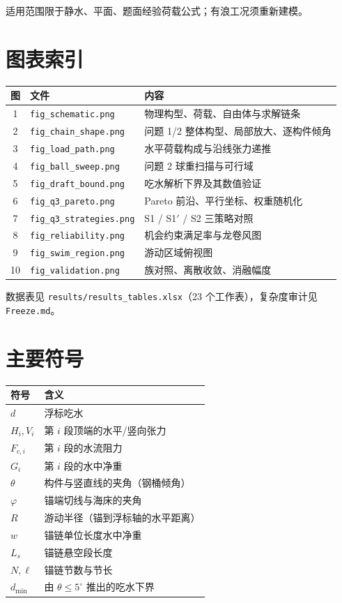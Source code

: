 \documentclass[UTF8,a4paper,zihao=-4]{ctexart}
\begin{document}
适用范围限于静水、平面、题面经验荷载公式；有浪工况须重新建模。

\appendix

\section{图表索引}

\begin{table}[H]
\centering
\begin{tabular}{clp{7.6cm}}
\toprule
图 & 文件 & 内容 \\
\midrule
1 & \texttt{fig\_schematic.png} & 物理构型、荷载、自由体与求解链条 \\
2 & \texttt{fig\_chain\_shape.png} & 问题 1/2 整体构型、局部放大、逐构件倾角 \\
3 & \texttt{fig\_load\_path.png} & 水平荷载构成与沿线张力递推 \\
4 & \texttt{fig\_ball\_sweep.png} & 问题 2 球重扫描与可行域 \\
5 & \texttt{fig\_draft\_bound.png} & 吃水解析下界及其数值验证 \\
6 & \texttt{fig\_q3\_pareto.png} & Pareto 前沿、平行坐标、权重随机化 \\
7 & \texttt{fig\_q3\_strategies.png} & S1 / S1\('\) / S2 三策略对照 \\
8 & \texttt{fig\_reliability.png} & 机会约束满足率与龙卷风图 \\
9 & \texttt{fig\_swim\_region.png} & 游动区域俯视图 \\
10 & \texttt{fig\_validation.png} & 族对照、离散收敛、消融幅度 \\
\bottomrule
\end{tabular}
\end{table}

数据表见 \texttt{results/results\_tables.xlsx}（23 个工作表），复杂度审计见 \texttt{Freeze.md}。

\section{主要符号}

\begin{table}[H]
\centering
\begin{tabular}{ll}
\toprule
符号 & 含义 \\
\midrule
\(d\) & 浮标吃水 \\
\(H_i,V_i\) & 第 \(i\) 段顶端的水平/竖向张力 \\
\(F_{c,i}\) & 第 \(i\) 段的水流阻力 \\
\(G_i\) & 第 \(i\) 段的水中净重 \\
\(\theta\) & 构件与竖直线的夹角（钢桶倾角） \\
\(\varphi\) & 锚端切线与海床的夹角 \\
\(R\) & 游动半径（锚到浮标轴的水平距离） \\
\(w\) & 锚链单位长度水中净重 \\
\(L_s\) & 锚链悬空段长度 \\
\(N,\ell\) & 锚链节数与节长 \\
\(d_{\min}\) & 由 \(\theta\le5^\circ\) 推出的吃水下界 \\
\bottomrule
\end{tabular}
\end{table}
\end{document}
